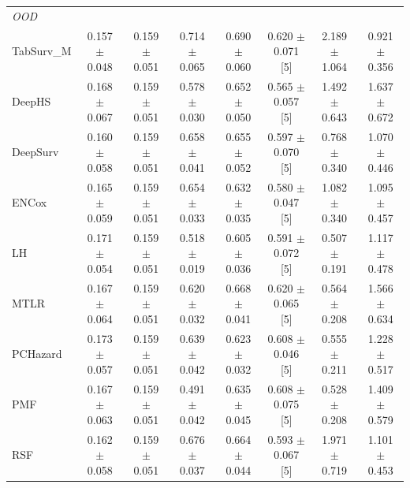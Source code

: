\begin{table}[t]
\begin{tabular}{lccccccc}
\midrule
\multicolumn{8}{l}{\textit{OOD}} \\
TabSurv\_M & 0.157 $\pm$ 0.048 & 0.159 $\pm$ 0.051 & 0.714 $\pm$ 0.065 & 0.690 $\pm$ 0.060 & 0.620 $\pm$ 0.071 [5] & 2.189 $\pm$ 1.064 & 0.921 $\pm$ 0.356 \\
DeepHS & 0.168 $\pm$ 0.067 & 0.159 $\pm$ 0.051 & 0.578 $\pm$ 0.030 & 0.652 $\pm$ 0.050 & 0.565 $\pm$ 0.057 [5] & 1.492 $\pm$ 0.643 & 1.637 $\pm$ 0.672 \\
DeepSurv & 0.160 $\pm$ 0.058 & 0.159 $\pm$ 0.051 & 0.658 $\pm$ 0.041 & 0.655 $\pm$ 0.052 & 0.597 $\pm$ 0.070 [5] & 0.768 $\pm$ 0.340 & 1.070 $\pm$ 0.446 \\
ENCox & 0.165 $\pm$ 0.059 & 0.159 $\pm$ 0.051 & 0.654 $\pm$ 0.033 & 0.632 $\pm$ 0.035 & 0.580 $\pm$ 0.047 [5] & 1.082 $\pm$ 0.340 & 1.095 $\pm$ 0.457 \\
LH & 0.171 $\pm$ 0.054 & 0.159 $\pm$ 0.051 & 0.518 $\pm$ 0.019 & 0.605 $\pm$ 0.036 & 0.591 $\pm$ 0.072 [5] & 0.507 $\pm$ 0.191 & 1.117 $\pm$ 0.478 \\
MTLR & 0.167 $\pm$ 0.064 & 0.159 $\pm$ 0.051 & 0.620 $\pm$ 0.032 & 0.668 $\pm$ 0.041 & 0.620 $\pm$ 0.065 [5] & 0.564 $\pm$ 0.208 & 1.566 $\pm$ 0.634 \\
PCHazard & 0.173 $\pm$ 0.057 & 0.159 $\pm$ 0.051 & 0.639 $\pm$ 0.042 & 0.623 $\pm$ 0.032 & 0.608 $\pm$ 0.046 [5] & 0.555 $\pm$ 0.211 & 1.228 $\pm$ 0.517 \\
PMF & 0.167 $\pm$ 0.063 & 0.159 $\pm$ 0.051 & 0.491 $\pm$ 0.042 & 0.635 $\pm$ 0.045 & 0.608 $\pm$ 0.075 [5] & 0.528 $\pm$ 0.208 & 1.409 $\pm$ 0.579 \\
RSF & 0.162 $\pm$ 0.058 & 0.159 $\pm$ 0.051 & 0.676 $\pm$ 0.037 & 0.664 $\pm$ 0.044 & 0.593 $\pm$ 0.067 [5] & 1.971 $\pm$ 0.719 & 1.101 $\pm$ 0.453 \\
\bottomrule
\end{tabular}
\end{table}
